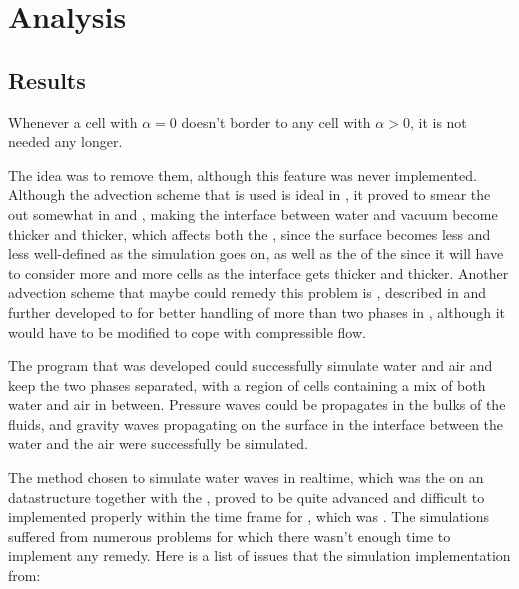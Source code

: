 \part{Analysis}

\chapter{Results}

Whenever a cell with $\alpha = 0$ doesn't border to any cell with $\alpha > 0$, it is not needed any longer.

The idea was to remove them, although this feature was never implemented. Although the advection scheme that is used is ideal in , it proved to smear the  out somewhat in  and , making the interface between water and vacuum become thicker and thicker, which affects both the , since the surface becomes less and less well-defined as the simulation goes on, as well as the \preformance of the  since it will have to consider more and more cells as the interface gets thicker and thicker. Another advection scheme that maybe could remedy this problem is \MULES, described in \citep{Berberovi2009} and further developed to for better handling of more than two phases in \citep{Kissling2010}, although it would have to be modified to cope with compressible flow.

\HRule


The program that was developed could successfully simulate water and air and keep the two phases separated, with a region of cells containing a mix of both water and air in between. Pressure waves could be propagates in the bulks of the fluids, and gravity waves propagating on the surface in the interface between the water and the air were successfully be simulated.


The method chosen to simulate water waves in realtime, which was the \FVM on an \octree datastructure together with the \VOF, proved to be quite advanced and difficult to implemented properly within the time frame for \thismasterthesiswork, which was \masterthesisworktime. The simulations suffered from numerous problems for which there wasn't enough time to implement any remedy. Here is a list of issues that the simulation implementation from:

